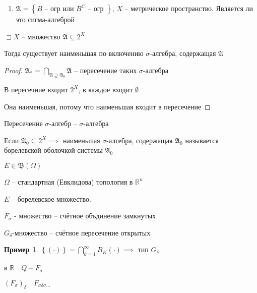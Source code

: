 \documentclass{book}
\newcommand\R{\ensuremath{\mathbb{R}}}
\renewcommand\O{\ensuremath{\emptyset}}
\theoremstyle{definition}
\newtheorem*{example}{Пример}
\begin{document}
\begin{problem}
     \begin{enumerate}
        \item $\mathfrak A =  \left\{ B \text{ -- огр или } B^C \text{ -- огр } \right\} $, $X$ -- метрическое пространство. Является ли это сигма-алгеброй
    \end{enumerate}
\end{problem}

\begin{statement}
    $\sqsupset X$ -- множество $\mathfrak A \subseteq 2^X$

    Тогда существует наименьшая по включению $\sigma$-алгебра, содержащая  $\mathfrak A$
\end{statement}
\begin{proof}
    $\mathfrak A_* = \bigcap\limits_{\mathfrak A \supseteq \mathfrak A_0}\mathfrak A $ -- пересечение таких $\sigma$-алгебра

    В пересечние входит  $2^X$, в каждое входит  $\O $

    Она наименьшая, потому что наименьшая входит в пересечение
\end{proof}

\begin{lemma}
    Пересечение $\sigma$-алгебр -- $\sigma$-алгебра
\end {lemma}

\begin{definition}
    Если $\mathfrak A_0 \subseteq 2^X \implies $ наименьшая $\sigma$-алгебра, содержащая  $\mathfrak A_0$  называется борелевской оболочкой системы $\mathfrak A_0$
\end{definition}

\begin{definition}
    $E\in \mathfrak B\left( \Omega \right) $

    $\Omega$ -- стандартная (Евклидова) топология в  $\R^n$ 

    $E$ -- борелевское множество.
    
    $F_{\sigma}$ - множество -- счётное объдинение замкнутых

    $G_{\delta}$-множество -- счётное пересечение открытых
\end{definition}

\begin{example}
    $\left\{ \left( \cdot  \right)  \right\}  = \bigcap\limits_{k=1}^{\infty }B_K\left( \cdot  \right)  \implies $ тип $G_{\delta}$

    в  $\R\quad Q$ -- $F_{\sigma}$

    $\left( F_{\sigma} \right) _{\delta}\quad F_{\sigma\delta\sigma \ldots}$
\end{example}
\end{document}
